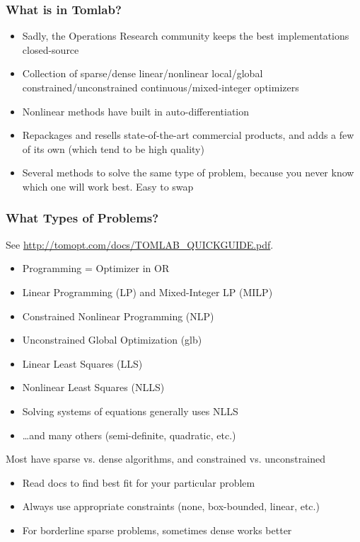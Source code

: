 \documentclass[nofootline]{etk-presentation}
\begin{document}
\begin{frame}[fragile]	\frametitle{What is in Tomlab?}
	\begin{itemize}
		\item Sadly, the Operations Research community keeps the best implementations closed-source
		\item Collection of sparse/dense linear/nonlinear local/global constrained/unconstrained continuous/mixed-integer optimizers
		\item Nonlinear methods have built in auto-differentiation
		\item Repackages and resells state-of-the-art commercial products, and adds a few of its own (which tend to be high quality)
		\item Several methods to solve the same type of problem, because you never know which one will work best.  Easy to swap
	\end{itemize}
\end{frame}

\begin{frame}[fragile]	\frametitle{What Types of Problems?}
	See \url{http://tomopt.com/docs/TOMLAB_QUICKGUIDE.pdf}. 
	\begin{itemize}
		\item Programming = Optimizer in OR
		\item Linear Programming (LP) and Mixed-Integer LP (MILP)
		\item Constrained Nonlinear Programming (NLP)
		\item Unconstrained Global Optimization (glb)
		\item Linear Least Squares (LLS)
		\item Nonlinear Least Squares (NLLS)
		\item Solving systems of equations generally uses NLLS
		\item \ldots and many others (semi-definite, quadratic, etc.)
	\end{itemize}
\medskip
	Most have sparse vs. dense algorithms, and constrained vs. unconstrained
	\begin{itemize}
		\item Read docs to find best fit for your particular problem
		\item Always use appropriate constraints (none, box-bounded, linear, etc.)
		\item For borderline sparse problems, sometimes dense works better
	\end{itemize}
\end{frame}
\end{document}
